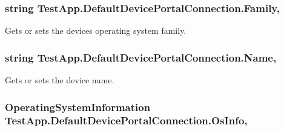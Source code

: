 \subsubsection[{\texorpdfstring{Family}{Family}}]{\setlength{\rightskip}{0pt plus 5cm}string Test\+App.\+Default\+Device\+Portal\+Connection.\+Family\hspace{0.3cm}{\ttfamily [get]}, {\ttfamily [set]}}\hypertarget{class_test_app_1_1_default_device_portal_connection_aba73087cacb18dc2ce8ffb0c042e5c7d}{}\label{class_test_app_1_1_default_device_portal_connection_aba73087cacb18dc2ce8ffb0c042e5c7d}


Gets or sets the device\textquotesingle{}s operating system family. 

\subsubsection[{\texorpdfstring{Name}{Name}}]{\setlength{\rightskip}{0pt plus 5cm}string Test\+App.\+Default\+Device\+Portal\+Connection.\+Name\hspace{0.3cm}{\ttfamily [get]}, {\ttfamily [set]}}\hypertarget{class_test_app_1_1_default_device_portal_connection_a55187e1b0595431204ee607391b8d64d}{}\label{class_test_app_1_1_default_device_portal_connection_a55187e1b0595431204ee607391b8d64d}


Gets or sets the device name. 

\subsubsection[{\texorpdfstring{Os\+Info}{OsInfo}}]{\setlength{\rightskip}{0pt plus 5cm}Operating\+System\+Information Test\+App.\+Default\+Device\+Portal\+Connection.\+Os\+Info\hspace{0.3cm}{\ttfamily [get]}, {\ttfamily [set]}}\hypertarget{class_test_app_1_1_default_device_portal_connection_a9dd0ab39e0afc5f920f55ff2544679ca}{}\label{class_test_app_1_1_default_device_portal_connection_a9dd0ab39e0afc5f920f55ff2544679ca}


